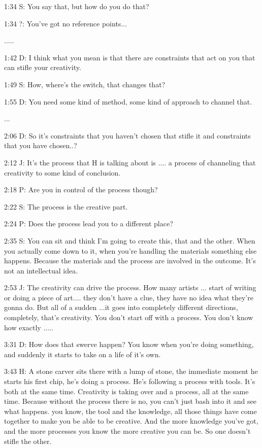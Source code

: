1:34 S: You say that, but how do you do that?

1:34 ?: You've got no reference points...

.....

1:42 D: I think what you mean is that there are constraints that act on you that can stifle your creativity.

1:49 S: How, where's the switch, that changes that?

1:55 D: You need some kind of method, some kind of approach to channel that.

...

2:06 D: So it's constraints that you haven't chosen that stifle it and constraints that you have chosen..?

2:12 J: It's the process that H is talking about is .... a process of channeling that creativity to some kind of conclusion.

2:18 P: Are you in control of the process though?

2:22 S: The process is the creative part.

2:24 P: Does the process lead you to a different place?

2:35 S: You can sit and think I'm going to create this, that and the other. When you actually come down to it, when you're handling the materials something else happens. Because the materials and the process are involved in the outcome. It's not an intellectual idea.

2:53 J: The creativity can drive the process. How many artists ... start of writing or doing a piece of art.... they don't have a clue, they have no idea what they're gonna do. But all of a sudden ...it goes into completely different directions, completely, that's creativity. You don't start off with a process. You don't know how exactly .....

3:31 D: How does that swerve happen? You know when you're doing something, and suddenly it starts to take on a life of it's own.

3:43 H: A stone carver sits there with a lump of stone, the immediate moment he starts his first chip, he's doing a process. He's following a process with tools. It's both at the same time. Creativity is taking over and a process, all at the same time. Because without the process there is no, you can't just bash into it and see what happens. you know, the tool and the knowledge, all those things have come together to make you be able to be creative. And the more knowledge you've got, and the more processes you know the more creative you can be. So one doesn't stifle the other.

